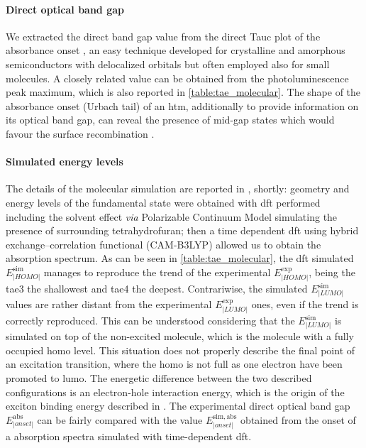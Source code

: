 	\paragraph{Direct optical band gap}
	We extracted the direct band gap value from the direct Tauc plot of the absorbance onset \cite{WikipediaTauc}, an easy technique developed for crystalline and amorphous semiconductors \cite{Stenzel2005} with delocalized orbitals but often employed also for small molecules.
	A closely related value can be obtained from the photoluminescence peak maximum, which is also reported in \cref{table:tae_molecular}.
	The shape of the absorbance onset (Urbach tail) of an \gls{htm}, additionally to provide information on its optical band gap, can reveal the presence of mid-gap states which would favour the surface recombination \cite{Tvingstedt2017}.

	\paragraph{Simulated energy levels}
	The details of the molecular simulation are reported in \cite{Gelmetti2019}, shortly: geometry and energy levels of the fundamental state were obtained with \gls{dft} performed including the solvent effect \textsl{via} Polarizable Continuum Model simulating the presence of surrounding tetrahydrofuran; then a time dependent \gls{dft} using hybrid exchange–correlation functional (CAM-B3LYP) allowed us to obtain the absorption spectrum.	
	As can be seen in \cref{table:tae_molecular}, the \gls{dft} simulated $E^{\mathrm{sim}}_|HOMO|$ manages to reproduce the trend of the experimental $E^{\mathrm{exp}}_|HOMO|$, being the \gls{tae3} the shallowest and \gls{tae4} the deepest.
	Contrariwise, the simulated $E^{\mathrm{sim}}_|LUMO|$ values are rather distant from the experimental $E^{\mathrm{exp}}_|LUMO|$ ones, even if the trend is correctly reproduced.
	This can be understood considering that the $E^{\mathrm{sim}}_|LUMO|$ is simulated on top of the non\hyp{}excited molecule, which is the molecule with a fully occupied \gls{homo} level.
	This situation does not properly describe the final point of an excitation transition, where the \gls{homo} is not full as one electron have been promoted to \gls{lumo}.
	The energetic difference between the two described configurations is an electron\hyp{}hole interaction energy, which is the origin of the exciton binding energy described in .
	The experimental direct optical band gap \small$E^{\mathrm{abs}}_|onset|$ can be fairly compared with the value $E^{\mathrm{sim,abs}}_|onset|$ obtained from the onset of a absorption spectra simulated with time\hyp{}dependent \gls{dft}.

